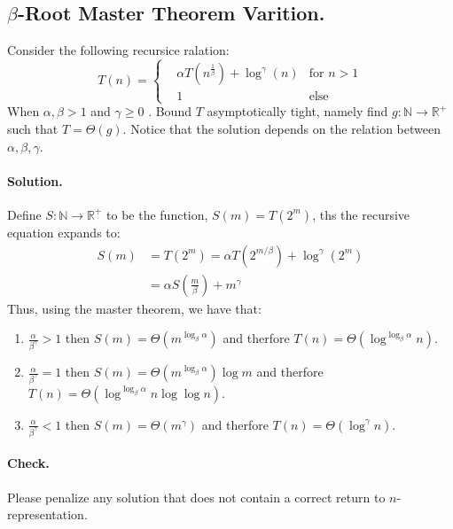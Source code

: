 \subsection{$\beta$-Root Master Theorem Varition.}
Consider the following recursice ralation: 
\begin{equation*}
    T\left(n\right)  = \left\{ \begin{array}{rcl}
        & \alpha T(n^{\frac{1}{\beta}}) + \log^{\gamma} \left( n \right)  & \mbox{for }  n > 1  \\
      & 1 & \mbox{else}  
  \end{array} \right. 
\end{equation*}
When $\alpha, \beta > 1 $ and $\gamma \ge 0$ . Bound $T$ asymptotically tight, namely find $g: \mathbb{N} \rightarrow \mathbb{R}^{+}$ such that $T = \Theta(g)$. Notice that the solution depends on the relation between $\alpha, \beta, \gamma$.

\ifdefined\SOLUTION
  \paragraph{Solution.}
  Define $S : \mathbb{N} \rightarrow \mathbb{R}^{+}$ to be the function, $S(m) = T(2^{m})$, ths the recursive equation expands to:
  \begin{equation*}
    \begin{split}
      S(m) & = T(2^{m}) = \alpha T(2^{m/\beta}) + \log^{\gamma}(2^{m}) \\
      &= \alpha S(\frac{m}{\beta}) + m^{\gamma}
    \end{split}
  \end{equation*}
  Thus, using the master theorem, we have that: 
  \begin{enumerate}
    \item $ \frac{\alpha}{\beta^{\gamma}} > 1 $ then $S(m) = \Theta(m^{\log_{\beta}\alpha})$ and therfore $T(n) = \Theta( \log^{\log_{\beta}\alpha} n)$. 
    \item  $ \frac{\alpha}{\beta^{\gamma}} = 1 $ then $S(m) = \Theta(m^{\log_{\beta}\alpha})\log m$ and therfore $T(n) = \Theta( \log^{\log_{\beta}\alpha} n \log \log n)$. 
    \item $ \frac{\alpha}{\beta^{\gamma}} < 1 $ then $S(m) = \Theta(m^{\gamma})$ and therfore $T(n) = \Theta( \log^{\gamma} n)$. 
  \end{enumerate}

\ifdefined\CHECK
  \paragraph{Check.} Please penalize any solution that does not contain a correct return to $n$-representation.
\fi

